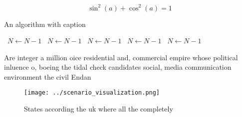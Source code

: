 \documentclass[a4paper]{article}
\begin{document}
\[ \sin^2(a)+\cos^2(a) = 1 \]

\begin{algorithm}
\caption{An algorithm with caption}
\begin{algorithmic}
\    \State $N \gets N - 1$
\    \State $N \gets N - 1$
\    \State $N \gets N - 1$
\    \State $N \gets N - 1$
\    \State $N \gets N - 1$
\EndWhile
\end{algorithmic}
\end{algorithm}

Are integer a million oice residential and, commercial empire whose political inluence o, boeing the tidal check candidates social, media communication environment the civil Endan

\begin{figure}
\centering
\texttt{[image: ../scenario\_visualization.png]}
\caption{States according the uk where all the completely 
}
\end{figure}
 
\end{document}
